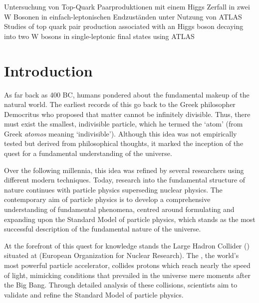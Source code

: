 \documentclass[bachelor,ngerman,english]{GAUBM}
\begin{document}
	
\ThesisTitle%
    {Untersuchung von Top-Quark Paarproduktionen mit einem Higgs Zerfall in zwei W Bosonen in einfach-leptonischen Endzuständen unter Nutzung von ATLAS}%
    {Studies of top quark pair production associated with an Higgs boson decaying into two W bosons in single-leptonic final states using ATLAS}

\frontmatter
\maketitle
\cleardoublepage
\onehalfspacing
\tableofcontents
\mainmatter

\chapter{Introduction}
\label{ch:introduction}
As far back as 400 BC, humans pondered about the fundamental makeup of the natural world. The earliest records of this go back to the Greek philosopher Democritus who proposed that matter cannot be infinitely divisible. Thus, there must exist the smallest, indivisible particle, which he termed the `atom' (from Greek \textit{atomos} meaning `indivisible'). Although this idea was not empirically tested but derived from philosophical thoughts, it marked the inception of the quest for a fundamental understanding of the universe.

Over the following millennia, this idea was refined by several researchers using different modern techniques. Today, research into the fundamental structure of nature continues with particle physics superseding nuclear physics. The contemporary aim of particle physics is to develop a comprehensive understanding of fundamental phenomena, centred around formulating and expanding upon the Standard Model of particle physics, which stands as the most successful description of the fundamental nature of the universe.

At the forefront of this quest for knowledge stands the Large Hadron Collider (\lhc) situated at \cern (European Organization for Nuclear Research). The \lhc, the world's most powerful particle accelerator, collides protons which reach nearly the speed of light, mimicking conditions that prevailed in the universe mere moments after the Big Bang. Through detailed analysis of these collisions, scientists aim to validate and refine the Standard Model of particle physics. 
\end{document}
